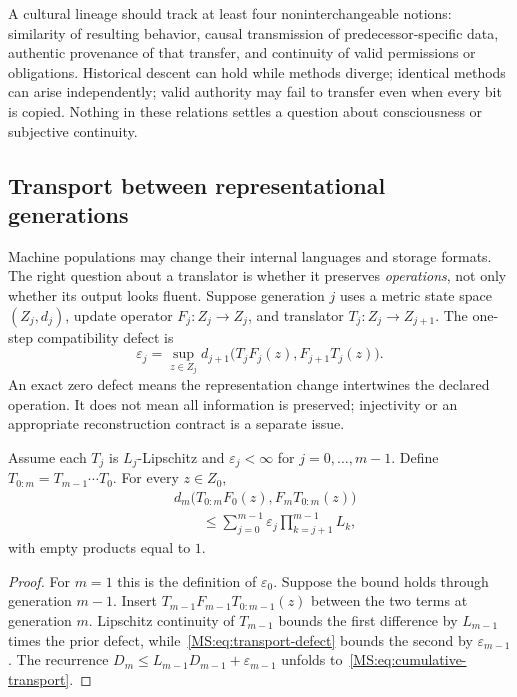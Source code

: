 A cultural lineage should track at least four noninterchangeable notions: similarity of resulting behavior, causal transmission of predecessor-specific data, authentic provenance of that transfer, and continuity of valid permissions or obligations. Historical descent can hold while methods diverge; identical methods can arise independently; valid authority may fail to transfer even when every bit is copied. Nothing in these relations settles a question about consciousness or subjective continuity.

\subsection{Transport between representational generations}

Machine populations may change their internal languages and storage formats. The right question about a translator is whether it preserves \emph{operations}, not only whether its output looks fluent. Suppose generation $j$ uses a metric state space $(Z_j,d_j)$, update operator $F_j:Z_j\to Z_j$, and translator $T_j:Z_j\to Z_{j+1}$. The one-step compatibility defect is
\begin{equation}\label{MS:eq:transport-defect}
\varepsilon_j=\sup_{z\in Z_j}d_{j+1}\bigl(T_jF_j(z),F_{j+1}T_j(z)\bigr).
\end{equation}
An exact zero defect means the representation change intertwines the declared operation. It does not mean all information is preserved; injectivity or an appropriate reconstruction contract is a separate issue.

\begin{MSproposition}\label{MS:prop:transport}
Assume each $T_j$ is $L_j$-Lipschitz and $\varepsilon_j<\infty$ for $j=0,\ldots,m-1$. Define $T_{0:m}=T_{m-1}\cdots T_0$. For every $z\in Z_0$,
\begin{equation}\label{MS:eq:cumulative-transport}
\begin{split}
&d_m\bigl(T_{0:m}F_0(z),F_mT_{0:m}(z)\bigr)\\
&\qquad\le\sum_{j=0}^{m-1}\varepsilon_j\prod_{k=j+1}^{m-1}L_k,
\end{split}
\end{equation}
with empty products equal to $1$.
\end{MSproposition}
\begin{proof}
For $m=1$ this is the definition of $\varepsilon_0$. Suppose the bound holds through generation $m-1$. Insert $T_{m-1}F_{m-1}T_{0:m-1}(z)$ between the two terms at generation $m$. Lipschitz continuity of $T_{m-1}$ bounds the first difference by $L_{m-1}$ times the prior defect, while~\eqref{MS:eq:transport-defect} bounds the second by $\varepsilon_{m-1}$. The recurrence $D_m\le L_{m-1}D_{m-1}+\varepsilon_{m-1}$ unfolds to~\eqref{MS:eq:cumulative-transport}.
\end{proof}

